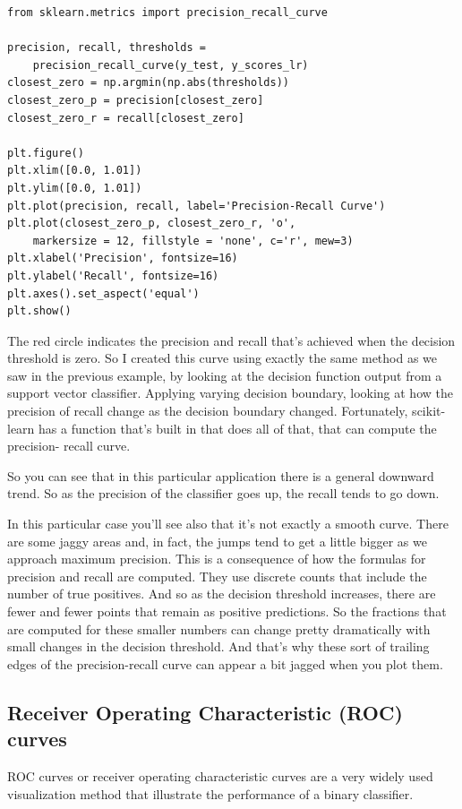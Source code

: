 \begin{multicols}{2}
{\scriptsize
\begin{verbatim}
from sklearn.metrics import precision_recall_curve

precision, recall, thresholds = 
    precision_recall_curve(y_test, y_scores_lr)
closest_zero = np.argmin(np.abs(thresholds))
closest_zero_p = precision[closest_zero]
closest_zero_r = recall[closest_zero]

plt.figure()
plt.xlim([0.0, 1.01])
plt.ylim([0.0, 1.01])
plt.plot(precision, recall, label='Precision-Recall Curve')
plt.plot(closest_zero_p, closest_zero_r, 'o', 
    markersize = 12, fillstyle = 'none', c='r', mew=3)
plt.xlabel('Precision', fontsize=16)
plt.ylabel('Recall', fontsize=16)
plt.axes().set_aspect('equal')
plt.show()
\end{verbatim}
}
The red circle indicates the precision and recall that's achieved when the decision threshold is zero. So I created this curve using exactly the same method as we saw in the previous example, by looking at the decision function output from a support vector classifier. Applying varying  decision boundary, looking at how the precision of recall change as the decision boundary changed. Fortunately, scikit-learn has a function that's built in that does all of that, that can compute the precision- recall curve. 

So you can see that in this particular application there is a general downward trend. So as the precision of the classifier goes up, the recall tends to go down. 

In this particular case you'll see also that it's not exactly a smooth curve. There are some jaggy areas and, in fact, the jumps tend to get a little bigger as we approach maximum precision. This is a consequence of how the formulas for precision and recall are computed. They use discrete counts that include the number of true positives. And so as the decision threshold increases, there are fewer and fewer points that remain as positive predictions. So the fractions that are computed for these smaller numbers can change pretty dramatically with small changes in the decision threshold. And that's why these sort of trailing edges of the precision-recall curve can appear a bit jagged when you plot them. 

\subsection{Receiver Operating Characteristic (ROC) curves}

ROC curves or receiver operating characteristic curves are a very widely used visualization method that illustrate the performance of a binary classifier. 


\end{multicols}
